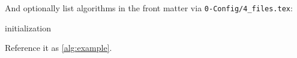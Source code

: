 And optionally list algorithms in the front matter via \texttt{0-Config/4\_files.tex}:
\begin{latexcode}
\end{latexcode}

\begin{algorithm}[htbp]
  initialization\;
  \caption{Example algorithm using \texttt{algorithm2e}.}
  \label{alg:example}
\end{algorithm}

Reference it as \autoref{alg:example}.

